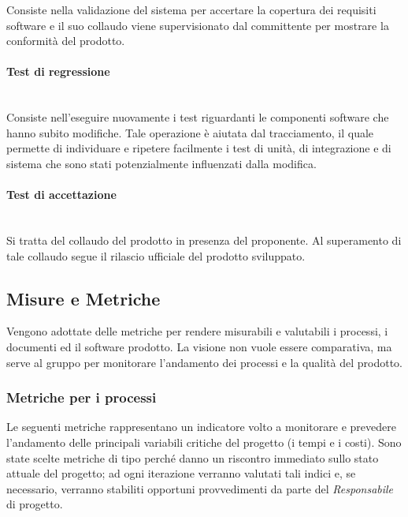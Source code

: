 			Consiste nella validazione del sistema per accertare la copertura dei requisiti software e il suo collaudo viene supervisionato dal committente per mostrare la conformità del prodotto.
			
			\paragraph{Test di regressione} \mbox{} \\

			Consiste nell'eseguire nuovamente i test riguardanti le componenti software che hanno subito modifiche.	Tale operazione è aiutata dal tracciamento, il quale permette di individuare e ripetere facilmente i test di unità, di integrazione e di sistema che sono stati potenzialmente influenzati dalla modifica.
			
			\paragraph{Test di accettazione} \mbox{} \\

			Si tratta del collaudo del prodotto in presenza del proponente. Al superamento di tale collaudo segue il rilascio ufficiale del prodotto sviluppato.
			
	
	\subsection{Misure e Metriche}
	\label{MisureMetriche}
	
	Vengono adottate delle metriche per rendere misurabili e valutabili i processi, i documenti ed il software prodotto. La visione non vuole essere comparativa, ma serve al gruppo per monitorare l'andamento dei processi e la qualità del prodotto.
		
		\subsubsection{Metriche per i processi}
		\label{MetricheProcessi}
		Le seguenti metriche rappresentano un indicatore volto a monitorare e prevedere l'andamento delle principali variabili critiche del progetto (i tempi e i costi). Sono state scelte metriche di tipo  perché danno un riscontro immediato sullo stato attuale del progetto; ad ogni iterazione verranno valutati tali indici e, se necessario, verranno stabiliti opportuni provvedimenti da parte del \emph{Responsabile} di progetto.
		
